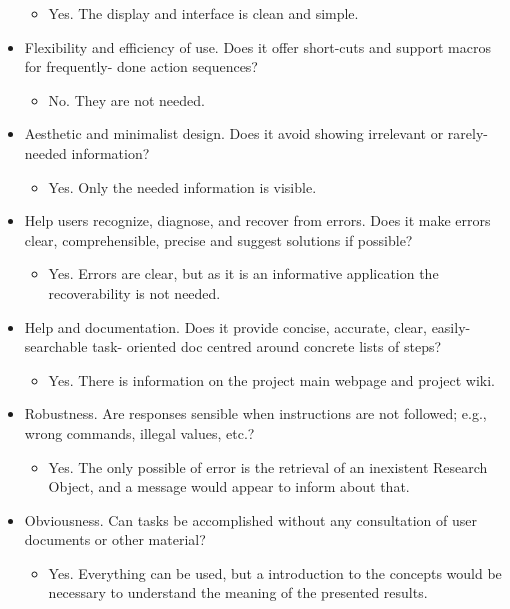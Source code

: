 \begin{itemize}
  \begin{itemize}
  \itemsep1pt\parskip0pt
  \item
    Yes. The display and interface is clean and simple.
  \end{itemize}
\item
  Flexibility and efficiency of use. Does it offer short-cuts and
  support macros for frequently- done action sequences?

  \begin{itemize}
  \itemsep1pt\parskip0pt
  \item
    No. They are not needed.
  \end{itemize}
\item
  Aesthetic and minimalist design. Does it avoid showing irrelevant or
  rarely-needed information?

  \begin{itemize}
  \itemsep1pt\parskip0pt
  \item
    Yes. Only the needed information is visible.
  \end{itemize}
\item
  Help users recognize, diagnose, and recover from errors. Does it make
  errors clear, comprehensible, precise and suggest solutions if
  possible?

  \begin{itemize}
  \itemsep1pt\parskip0pt
  \item
    Yes. Errors are clear, but as it is an informative application the
    recoverability is not needed.
  \end{itemize}
\item
  Help and documentation. Does it provide concise, accurate, clear,
  easily-searchable task- oriented doc centred around concrete lists of
  steps?

  \begin{itemize}
  \itemsep1pt\parskip0pt
  \item
    Yes. There is information on the project main webpage and project
    wiki.
  \end{itemize}
\item
  Robustness. Are responses sensible when instructions are not followed;
  e.g., wrong commands, illegal values, etc.?

  \begin{itemize}
  \itemsep1pt\parskip0pt
  \item
    Yes. The only possible of error is the retrieval of an inexistent
    Research Object, and a message would appear to inform about that.
  \end{itemize}
\item
  Obviousness. Can tasks be accomplished without any consultation of
  user documents or other material?

  \begin{itemize}
  \itemsep1pt\parskip0pt
  \item
    Yes. Everything can be used, but a introduction to the concepts
    would be necessary to understand the meaning of the presented
    results.
  \end{itemize}
\end{itemize}

